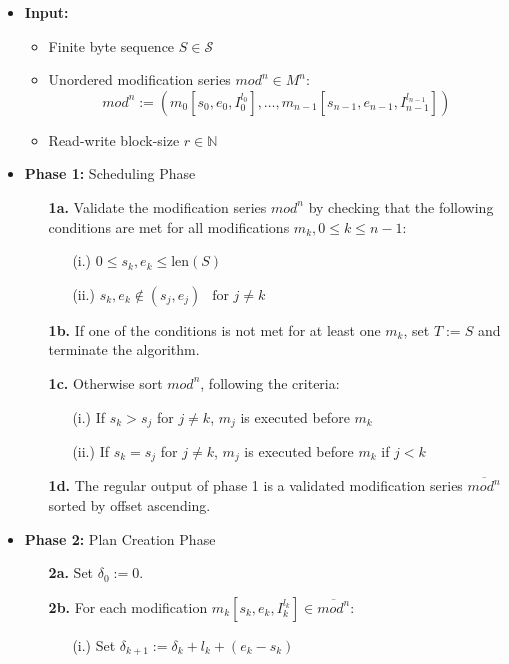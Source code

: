 \documentclass[english, 10pt, openright, twocolumn, landscape, twoside, notitlepage, a4paper, pdftex]		
{article}
\begin{document}
\begin{itemize}
\item \textbf{Input:}
\begin{itemize}
\item Finite byte sequence $S\in\mathcal{S}$
\item Unordered modification series $mod^{n}\in M^{n}$:
\[mod^{n}:=\left(m_{0}[s_{0}, e_{0}, I_{0}^{l_{0}}],\ldots,m_{n-1}[s_{n-1}, e_{n-1}, I_{n-1}^{l_{n-1}}]\right)\] 
\item Read-write block-size $r\in\mathbb{N}$
\end{itemize}
\item \textbf{Phase 1:} Scheduling Phase
\begin{enumerate}
\item[\textbf{1a.}] Validate the modification series $mod^{n}$ by checking that the following conditions are met for all modifications $m_{k}, 0\leq k\leq n-1$:
\begin{enumerate}
\item[(i.)] $0\leq s_{k},e_{k}\leq \text{len}(S)$
\item[(ii.)] $s_{k},e_{k}\notin(s_{j}, e_{j})\ \ \text{ for } j\neq k$
\end{enumerate}
\item [\textbf{1b.}] If one of the conditions is not met for at least one $m_{k}$, set $T:=S$ and terminate the algorithm.
\item [\textbf{1c.}] Otherwise sort $mod^{n}$, following the criteria:
\begin{enumerate}
\item[(i.)] If $s_{k}>s_{j}$ for $j\neq k$, $m_{j}$ is executed before $m_{k}$
\item[(ii.)] If $s_{k}=s_{j}$ for $j\neq k$, $m_{j}$ is executed before $m_{k}$ if $j<k$
\end{enumerate}
\item [\textbf{1d.}] The regular output of phase 1 is a validated modification series $\overline{mod^{n}}$ sorted by offset ascending.
\end{enumerate}
\item \textbf{Phase 2:} Plan Creation Phase
\begin{enumerate}
\item [\textbf{2a.}] Set $\delta_{0}:=0$.
\item [\textbf{2b.}] For each modification $m_{k}[s_{k}, e_{k}, I_{k}^{l_{k}}]\in\overline{mod^{n}}$:
\begin{enumerate}
\item [(i.)] Set $\delta_{k+1}:=\delta_{k}+l_{k}+(e_{k}-s_{k})$

\end{enumerate}
\end{enumerate}
\end{itemize}
\end{document}
